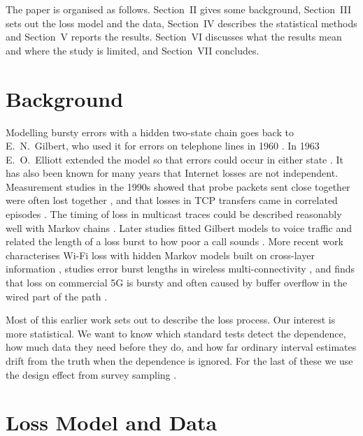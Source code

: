 \documentclass[conference]{IEEEtran}
\begin{document}
The paper is organised as follows. Section~II gives some background, Section~III sets out the loss model and the data, Section~IV describes the statistical methods and Section~V reports the results. Section~VI discusses what the results mean and where the study is limited, and Section~VII concludes.

\section{Background}
Modelling bursty errors with a hidden two-state chain goes back to E.~N.~Gilbert, who used it for errors on telephone lines in 1960 \cite{gilbert1960}. In 1963 E.~O.~Elliott extended the model so that errors could occur in either state \cite{elliott1963}. It has also been known for many years that Internet losses are not independent. Measurement studies in the 1990s showed that probe packets sent close together were often lost together \cite{bolot1993}, and that losses in TCP transfers came in correlated episodes \cite{paxson1997}. The timing of loss in multicast traces could be described reasonably well with Markov chains \cite{yajnik1999}. Later studies fitted Gilbert models to voice traffic and related the length of a loss burst to how poor a call sounds \cite{jiang2000,hasslinger2008}. More recent work characterises Wi-Fi loss with hidden Markov models built on cross-layer information \cite{dasilva2022}, studies error burst lengths in wireless multi-connectivity \cite{nielsen2019}, and finds that loss on commercial 5G is bursty and often caused by buffer overflow in the wired part of the path \cite{xu2020}.

Most of this earlier work sets out to describe the loss process. Our interest is more statistical. We want to know which standard tests detect the dependence, how much data they need before they do, and how far ordinary interval estimates drift from the truth when the dependence is ignored. For the last of these we use the design effect from survey sampling \cite{kish1965}.

\section{Loss Model and Data}
\end{document}
